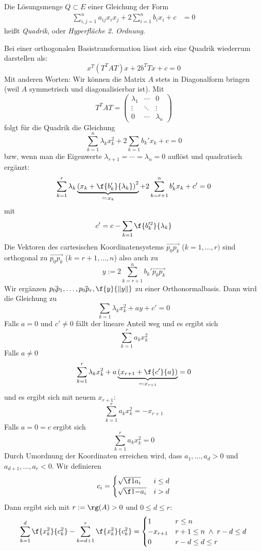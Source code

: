 \documentclass{mycourse}
\begin{document}
\begin{df}
	\label{df:14.2}
	Die Lösungsmenge $Q\subset E$ einer Gleichung der Form
	\begin{align*}
		\sum_{i,j=1}^n a_{ij}x_ix_j + 2 \sum_{i=1}^n b_i x_i + c &= 0
	\end{align*}
	heißt \emph{Quadrik}, oder \emph{Hyperfläche 2. Ordnung}.
\end{df}

Bei einer orthogonalen Basistransformation lässt sich eine Quadrik wiederrum darstellen als:
\[
	x^T(T^TAT)x + 2b^TTx + c = 0
\]
Mit anderen Worten: Wir können die Matrix $A$ stets in Diagonalform bringen (weil $A$ symmetrisch und diagonalisierbar ist).
Mit
\[
	T^TAT = \begin{pmatrix}\lambda_1 & \cdots & 0\\ \vdots & \ddots & \vdots \\ 0 & \cdots & \lambda_n\end{pmatrix}
\]
folgt für die Quadrik die Gleichung
\[
	\sum_{k=1}^n \lambda_kx_k^2 + 2\sum_{k=1}b_k'x_k + c = 0
\]
bzw, wenn man die Eigenwerte $\lambda_{r+1}=\dotsb=\lambda_n=0$ auflöst und quadratisch ergänzt:
\[
	\sum_{k=1}^r \lambda_k\underbrace{\left(x_k + \f{b_k'}{\lambda_k}\right)^2}_{=: x_k} + 2\sum_{k=r+1}^n b_k'x_{k} + c' = 0
\]
mit
\[
	c' = c - \sum_{k=1}\f{b_k'^2}{\lambda_k}
\]
Die Vektoren des cartesischen Koordinatensystems $\vec{p_0p_k}$ ($k=1,\dotsc,r)$ sind orthogonal zu $\vec{p_0p_{k}}$ ($k=r+1,\dotsc, n$) also auch zu
\[
	y := 2\sum_{k=r+1}^n b_{k}'\vec{p_0p_{k}}
\]
Wir ergänzen $\vec{p_0p_1},\dotsc, \vec{p_0p_r}, \f {y}{\|y\|}$ zu einer Orthonormalbasis.
Dann wird die Gleichung zu
\[
	\sum_{k=1}\lambda_kx_k^2 + ay + c' = 0
\]
Falls $a=0$ und $c' \neq 0$ fällt der lineare Anteil weg und es ergibt sich
\[
	\sum_{k=1}^r a_kx_k^2 
\]
Falls $a\neq 0$
\[
	\sum_{k=1}^r \lambda_kx_k^2 + a\underbrace{\left(x_{r+1} + \f {c'}{a}\right)}_{=:x_{r+1}} = 0
\]
und es ergibt sich mit neuem $x_{r+1}$:
\[
	\sum_{k=1}^r a_kx_k^2 = -x_{r+1}
\]
Falls $a=0=c$ ergibt sich
\[
	\sum_{k=1}^r a_kx_k^2 = 0
\]
Durch Umordnung der Koordinaten erreichen wird, dass $a_1,\dots,a_d > 0$ und $a_{d+1},\dotsc, a_r < 0$.
Wir definieren
\[
	c_i = \begin{cases} \sqrt{\f 1{a_i}} & i \le d\\ \sqrt{\f 1{-a_i}} & i > d\end{cases}
\]
Dann ergibt sich mit $r:= \rg(A) >0$ und $0\le d \le r$:
\[
	\sum_{k=1}^d\f{x_k^2}{c_k^2} - \sum_{k=d+1}^r \f{x_{k}^2}{c_k^2} = \begin{cases}
		1 & r \le n\\
		-x_{r+1} & r+1 \le n \;\land\; r-d \le d\\
		0 & r-d \le d \le r
	\end{cases}
\]
\end{document}
